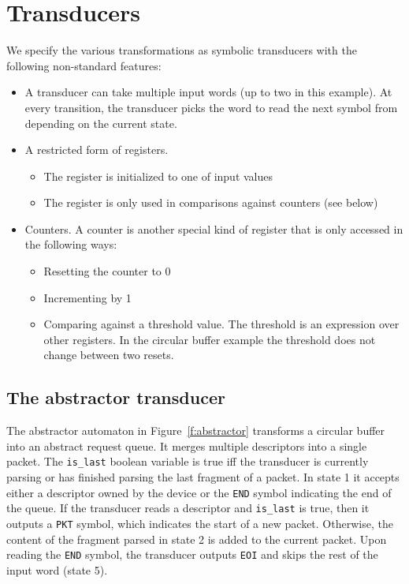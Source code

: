 \documentclass{article}
\begin{document}
\section{Transducers}

We specify the various transformations as symbolic transducers 
with the following non-standard features:

\begin{itemize}
    \item A transducer can take multiple input words (up to two in 
        this example).  At every transition, the transducer picks 
        the word to read the next symbol from depending on the 
        current state.  

    \item A restricted form of registers.
        \begin{itemize}
            \item The register is initialized to one of input 
                values
            \item The register is only used in comparisons against 
                counters (see below)
        \end{itemize}

    \item Counters.  A counter is another special kind of register 
        that is only accessed in the following ways:
        \begin{itemize}
            \item Resetting the counter to 0
            \item Incrementing by 1
            \item Comparing against a threshold value.  The 
                threshold is an expression over other registers.  
                In the circular buffer example the threshold does 
                not change between two resets.
        \end{itemize}
\end{itemize}

\subsection{The abstractor transducer}

The abstractor automaton in Figure~\ref{f:abstractor} transforms a 
circular buffer into an abstract request queue.  It merges 
multiple descriptors into a single packet.  The \texttt{is\_last} 
boolean variable is true iff the transducer is currently parsing 
or has finished parsing the last fragment of a packet.  In state 1 
it accepts either a descriptor owned by the device or the 
\texttt{END} symbol indicating the end of the queue.  If the 
transducer reads a descriptor and \texttt{is\_last} is true, then 
it outputs a \texttt{PKT} symbol, which indicates the start of a 
new packet.  Otherwise, the content of the fragment parsed in 
state 2 is added to the current packet.  Upon reading the 
\texttt{END} symbol, the transducer outputs \texttt{EOI} and skips 
the rest of the input word (state 5).
\end{document}
